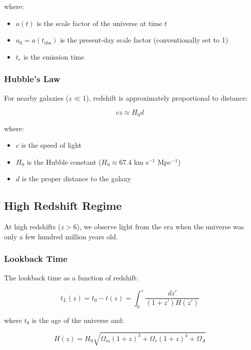 where:
\begin{itemize}
    \item $a(t)$ is the scale factor of the universe at time $t$
    \item $a_0 = a(t_{\text{obs}})$ is the present-day scale factor (conventionally set to 1)
    \item $t_e$ is the emission time
\end{itemize}

\subsubsection{Hubble's Law}

For nearby galaxies ($z \ll 1$), redshift is approximately proportional to distance:

\begin{equation}
\label{eq:hubble_law}
cz \approx H_0 d
\end{equation}

where:
\begin{itemize}
    \item $c$ is the speed of light
    \item $H_0$ is the Hubble constant ($H_0 \approx 67.4$ km s$^{-1}$ Mpc$^{-1}$)
    \item $d$ is the proper distance to the galaxy
\end{itemize}

\subsection{High Redshift Regime}

At high redshifts ($z > 6$), we observe light from the era when the universe was only a few hundred million years old.

\subsubsection{Lookback Time}

The lookback time as a function of redshift:

\begin{equation}
\label{eq:lookback_time}
t_L(z) = t_0 - t(z) = \int_0^z \frac{dz'}{(1+z')H(z')}
\end{equation}

where $t_0$ is the age of the universe and:

\begin{equation}
\label{eq:hubble_parameter}
H(z) = H_0 \sqrt{\Omega_m(1+z)^3 + \Omega_r(1+z)^4 + \Omega_\Lambda}
\end{equation}

